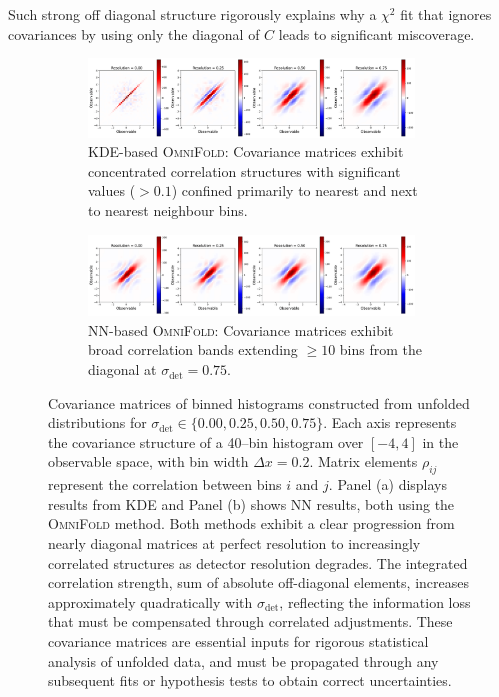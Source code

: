             Such strong off diagonal structure rigorously explains why a $\chi^2$ fit that ignores covariances by using only the diagonal of $C$ leads to significant miscoverage.
\begin{figure}
    \centering
    \begin{subfigure}[b]{\textwidth}
        \centering
        \includegraphics[width=0.95\textwidth]{figures/chapter-07/weight-histogram-covariance-1d.pdf}
        \caption{KDE-based \textsc{OmniFold}: Covariance matrices exhibit concentrated correlation structures with significant values ($>0.1$) confined primarily to nearest and next to nearest neighbour bins.\footnotemark}
        \label{fig:covar-kde}
    \end{subfigure}
    \begin{subfigure}[b]{\textwidth}
        \centering
        \includegraphics[width=0.95\textwidth]{figures/chapter-07/weight-histogram-covariance-1d-nn.pdf}
        \caption{NN-based \textsc{OmniFold}: Covariance matrices exhibit broad correlation bands extending $\ge10$ bins from the diagonal at $\sigma_{\text{det}} = 0.75$.\footnotemark}
        \label{fig:covar-nn}
    \end{subfigure}
    \caption[Covariance structure of binned unfolded distributions for KDE and NN-based methods.]{Covariance matrices of binned histograms constructed from unfolded distributions for $\sigma_{\text{det}} \in \{0.00, 0.25, 0.50, 0.75\}$. Each axis represents the covariance structure of a 40--bin histogram over $[-4, 4]$ in the observable space, with bin width $\Delta x = 0.2$. Matrix elements $\rho_{ij}$ represent the correlation between bins $i$ and $j$.
    Panel (a) displays results from KDE and Panel (b) shows NN results, both using the \textsc{OmniFold} method. Both methods exhibit a clear progression from nearly diagonal matrices at perfect resolution to increasingly correlated structures as detector resolution degrades.
    The integrated correlation strength, sum of absolute off-diagonal elements, increases approximately quadratically with $\sigma_{\text{det}}$, reflecting the information loss that must be compensated through correlated adjustments.
    These covariance matrices are essential inputs for rigorous statistical analysis of unfolded data, and must be propagated through any subsequent fits or hypothesis tests to obtain correct uncertainties.}
    \label{fig:weight-histogram-covariance-1d}
\end{figure}
